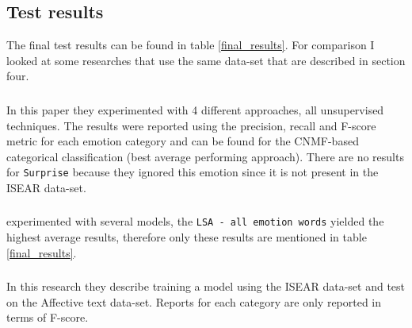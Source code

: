 \documentclass[11pt]{article}
\begin{document}
\subsection{Test results}
The final test results can be found in table \ref{final_results}. For comparison I looked at some researches that use the same data-set that are described in section four.

\subsubsection{}
In this paper \cite{kim2010evaluation} they experimented with 4 different approaches, all unsupervised techniques. The results were reported using the precision, recall and F-score metric for each emotion category and can be found for the CNMF-based categorical classification (best average performing approach). There are no results for \texttt{Surprise} because they ignored this emotion since it is not present in the ISEAR data-set.

\subsubsection{}
\cite{strapparava2008learning} experimented with several models, the \texttt{LSA - all emotion words} yielded the highest average results, therefore only these results are mentioned in table \ref{final_results}.

\subsubsection{}
In this research \cite{danisman2008feeler} they describe training a model using the ISEAR data-set and test on the Affective text data-set. Reports for each category are only reported in terms of F-score.
\end{document}
